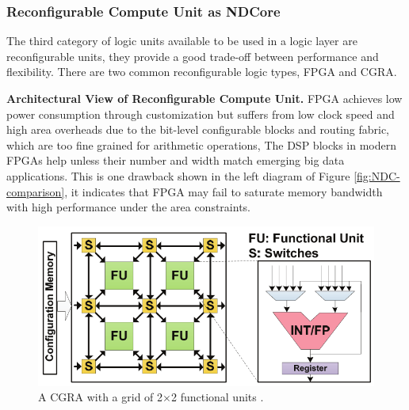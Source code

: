 \documentclass[letterpaper, 11pt, conference, margin=1in]{ieeeconf}   %
\begin{document}
\subsubsection{\bf Reconfigurable Compute Unit as NDCore}
The third category of logic units available to be used in a logic layer are reconfigurable units, they provide a good trade-off between performance and flexibility. There are two common reconfigurable logic types, FPGA and CGRA.

\textbf{Architectural View of Reconfigurable Compute Unit.} FPGA achieves low power consumption through customization but suffers from low clock speed and high area overheads due to the bit-level configurable blocks and routing fabric, which are too fine grained for arithmetic operations, The DSP blocks in modern FPGAs help unless their number and width match emerging big data applications. This is one drawback shown in the left diagram of Figure \ref{fig:NDC-comparison}, it indicates that FPGA may fail to saturate memory bandwidth with high performance under the area constraints.

\begin{figure}[h]
  \centering
  \includegraphics[scale=0.35]{figures/nda.png}
  \caption{A CGRA with a grid of 2$\times$2 functional units \cite{7056040}.}
  \label{fig:nda}
\end{figure}
\end{document}
